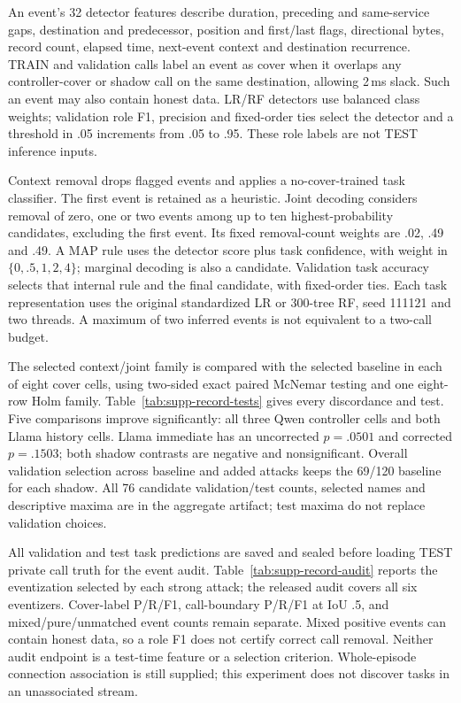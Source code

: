 An event's 32 detector features describe duration, preceding and same-service gaps, destination and predecessor, position and first/last flags, directional bytes, record count, elapsed time, next-event context and destination recurrence. TRAIN and validation calls label an event as cover when it overlaps any controller-cover or shadow call on the same destination, allowing 2\,ms slack. Such an event may also contain honest data. LR/RF detectors use balanced class weights; validation role F1, precision and fixed-order ties select the detector and a threshold in .05 increments from .05 to .95. These role labels are not TEST inference inputs.

Context removal drops flagged events and applies a no-cover-trained task classifier. The first event is retained as a heuristic. Joint decoding considers removal of zero, one or two events among up to ten highest-probability candidates, excluding the first event. Its fixed removal-count weights are .02, .49 and .49. A MAP rule uses the detector score plus task confidence, with weight in $\{0,.5,1,2,4\}$; marginal decoding is also a candidate. Validation task accuracy selects that internal rule and the final candidate, with fixed-order ties. Each task representation uses the original standardized LR or 300-tree RF, seed 111121 and two threads. A maximum of two inferred events is not equivalent to a two-call budget.

The selected context/joint family is compared with the selected baseline in each of eight cover cells, using two-sided exact paired McNemar testing and one eight-row Holm family. Table~\ref{tab:supp-record-tests} gives every discordance and test. Five comparisons improve significantly: all three Qwen controller cells and both Llama history cells. Llama immediate has an uncorrected $p=.0501$ and corrected $p=.1503$; both shadow contrasts are negative and nonsignificant. Overall validation selection across baseline and added attacks keeps the 69/120 baseline for each shadow. All 76 candidate validation/test counts, selected names and descriptive maxima are in the aggregate artifact; test maxima do not replace validation choices.

All validation and test task predictions are saved and sealed before loading TEST private call truth for the event audit. Table~\ref{tab:supp-record-audit} reports the eventization selected by each strong attack; the released audit covers all six eventizers. Cover-label P/R/F1, call-boundary P/R/F1 at IoU .5, and mixed/pure/unmatched event counts remain separate. Mixed positive events can contain honest data, so a role F1 does not certify correct call removal. Neither audit endpoint is a test-time feature or a selection criterion. Whole-episode connection association is still supplied; this experiment does not discover tasks in an unassociated stream.



